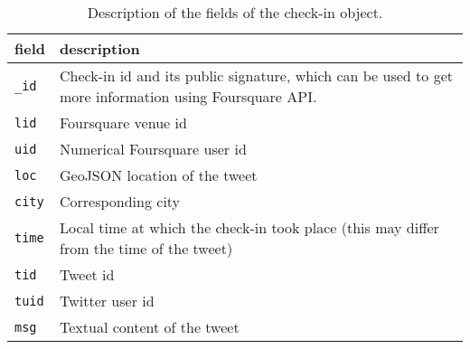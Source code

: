\begin{table}[ht]
    \centering
    \begin{tabularx}{\textwidth}{lX}
        \toprule
        field & description \\
        \midrule
        \texttt{\_id} & Check-in id and its public signature, which can be used
        to get more information using Foursquare API. \\
        \texttt{lid} & Foursquare venue id \\
        \texttt{uid} & Numerical Foursquare user id \\
        \texttt{loc} & GeoJSON location of the tweet \\
        \texttt{city} & Corresponding city \\
        \texttt{time} & Local time at which the check-in took place (this may differ from the time of the tweet) \\
        \texttt{tid} & Tweet id \\
        \texttt{tuid} & Twitter user id \\
        \texttt{msg} & Textual content of the tweet \\
        \bottomrule
    \end{tabularx}
    \caption[Check-in format]{Description of the fields of the check-in
    object.\label{tab:checkinfields}}
\end{table}

